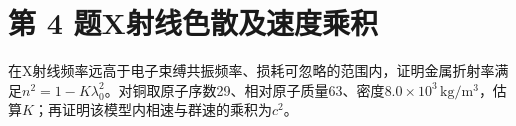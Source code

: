 \documentclass[UTF8,fontset=fandol,a4paper,11pt]{ctexart}
\begin{document}


\section*{第 4 题\quad X射线色散及速度乘积}\label{q:4}

在X射线频率远高于电子束缚共振频率、损耗可忽略的范围内，证明金属折射率满足$n^2=1-K\lambda_0^2$。对铜取原子序数29、相对原子质量63、密度$8.0\times10^3\,\mathrm{kg/m^3}$，估算$K$；再证明该模型内相速与群速的乘积为$c^2$。

\begin{center}\begin{minipage}{.98\linewidth}\centering
\begin{tikzpicture}[scale=.9,transform shape]

\end{tikzpicture}
\end{minipage}
\end{center}
\end{document}
